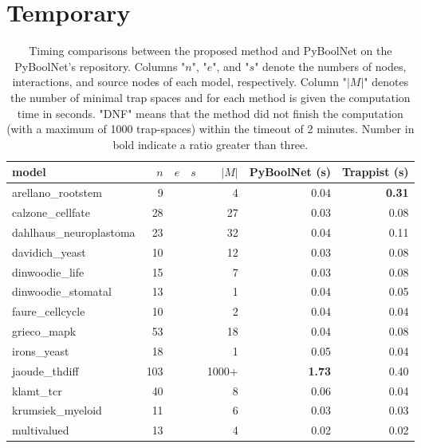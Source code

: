 \documentclass[runningheads]{llncs}
\begin{document}




\appendix

\section{Temporary}

\begin{table}[!htb]
  \caption{Timing comparisons between the proposed method and PyBoolNet on the PyBoolNet's repository.
    Columns "\(n\)", "\(e\)", and "\(s\)" denote the numbers of nodes, interactions, and source nodes of each model, respectively. Column "\(|M|\)" denotes the number of minimal trap spaces and for each method is given the computation time in seconds.
    "DNF" means that the method did not finish the computation (with a maximum of 1000 trap-spaces) within the timeout of 2 minutes. Number in bold indicate a ratio greater than three.}
  \centering
  \label{tab:pyboolnet_repo}
  \begin{tabular}{lrrrrrr}
    \toprule
    model & $n$ & $e$ & $s$ & $|M|$ & PyBoolNet (s) & Trappist (s) \\ \midrule
    arellano\_rootstem & 9 &&& 4 & 0.04 & \textbf{0.31}\\
    calzone\_cellfate & 28 &&& 27 & 0.03 & 0.08\\
    dahlhaus\_neuroplastoma & 23 &&& 32 & 0.04 & 0.11\\
    davidich\_yeast & 10 &&& 12 & 0.03 & 0.08\\
    dinwoodie\_life & 15 &&& 7 & 0.03 & 0.08\\
    dinwoodie\_stomatal & 13 &&& 1 & 0.04 & 0.05\\
    faure\_cellcycle & 10 &&& 2 & 0.04 & 0.04\\
    grieco\_mapk & 53 &&& 18 & 0.04 & 0.08\\
    irons\_yeast & 18 &&& 1 & 0.05 & 0.04\\
    jaoude\_thdiff & 103 &&& 1000+ & \textbf{1.73} & 0.40\\
    klamt\_tcr & 40 &&& 8 & 0.06 & 0.04\\
    krumsiek\_myeloid & 11 &&& 6 & 0.03 & 0.03\\
    multivalued & 13 &&& 4 & 0.02 & 0.02\\

\end{tabular}
\end{table}
\end{document}
